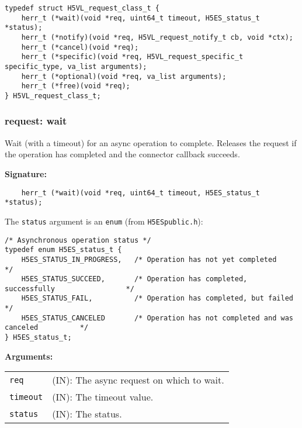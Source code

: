 \begin{lstlisting}[caption={Structure for async request callback routines, H5VLconnector.h}, captionpos=b, label={lst:Requestclass}]
typedef struct H5VL_request_class_t {                                            
    herr_t (*wait)(void *req, uint64_t timeout, H5ES_status_t *status);          
    herr_t (*notify)(void *req, H5VL_request_notify_t cb, void *ctx);            
    herr_t (*cancel)(void *req);                                                 
    herr_t (*specific)(void *req, H5VL_request_specific_t specific_type, va_list arguments);
    herr_t (*optional)(void *req, va_list arguments);                            
    herr_t (*free)(void *req);                                                   
} H5VL_request_class_t;
\end{lstlisting}

\subsubsection{request: wait}
Wait (with a timeout) for an async operation to complete. Releases the request if the operation has completed and the connector callback succeeds.

\begin{mdframed}[style=bgbox]
\textbf{Signature:}
\begin{lstlisting}
    herr_t (*wait)(void *req, uint64_t timeout, H5ES_status_t *status);          
\end{lstlisting}

The \texttt{status} argument is an \texttt{enum} (from \texttt{H5ESpublic.h}):
\begin{lstlisting}
/* Asynchronous operation status */                                              
typedef enum H5ES_status_t {                                                     
    H5ES_STATUS_IN_PROGRESS,   /* Operation has not yet completed                       */
    H5ES_STATUS_SUCCEED,       /* Operation has completed, successfully                 */
    H5ES_STATUS_FAIL,          /* Operation has completed, but failed                   */
    H5ES_STATUS_CANCELED       /* Operation has not completed and was canceled          */
} H5ES_status_t;
\end{lstlisting} 
    
\textbf{Arguments:}\\
\begin{tabular}{l p{13.5cm}}
  \texttt{req} & (IN): The async request on which to wait.\\
  \texttt{timeout} & (IN): The timeout value.\\
  \texttt{status} & (IN): The status.\\
\end{tabular}
\end{mdframed}

